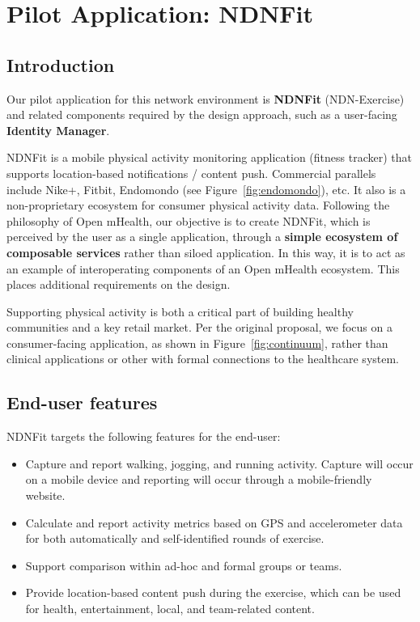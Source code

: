 \section{Pilot Application: NDNFit}

\subsection{Introduction}

Our pilot application for this network environment is \textbf{NDNFit} (NDN-Exercise) and related components required by the design approach, such as a user-facing \textbf{Identity Manager}.  

NDNFit is a mobile physical activity monitoring application (fitness tracker) that supports location-based notifications / content push. Commercial parallels include  Nike+, Fitbit, Endomondo (see Figure~\ref{fig:endomondo}), etc. It also is a non-proprietary ecosystem for consumer physical activity data. Following the philosophy of Open mHealth, our objective is to create NDNFit, which is perceived by the user as a single application, through  a \textbf{simple ecosystem of composable services} rather than siloed application. In this way, it is to act as an example of interoperating components of an Open mHealth ecosystem.  This places additional requirements on the design. 

Supporting physical activity is both a critical part of building healthy communities and a key retail market. Per the original proposal, we focus on a consumer-facing application, as shown in Figure~\ref{fig:continuum}, rather than clinical applications or other with formal connections to the healthcare system. 

\subsection{End-user features} 
NDNFit targets  the following features for the end-user:
\begin{itemize}
\item Capture and report walking, jogging, and running activity.  Capture will occur on a mobile device and reporting will occur through a mobile-friendly website. 
\item Calculate and report activity metrics based on GPS and accelerometer data for both automatically and self-identified rounds of exercise.  
\item Support comparison within ad-hoc and formal groups or teams. 
\item Provide location-based content push during the exercise, which can be used for health, entertainment, local, and team-related content. 
\end{itemize}


